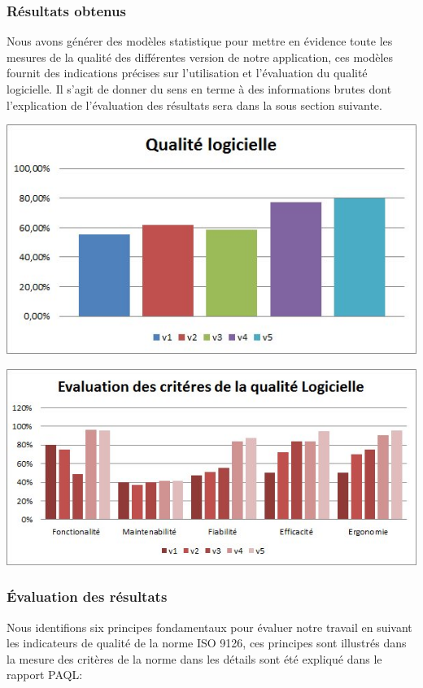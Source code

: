 \documentclass{scrartcl}
\begin{document}
\subsubsection{Résultats obtenus}

Nous avons générer des modèles statistique pour mettre en évidence toute les mesures de la qualité des différentes version de notre application, ces modèles fournit des indications précises sur l'utilisation et l'évaluation du qualité logicielle. Il s'agit de donner du sens en terme à des informations brutes dont l'explication de l'évaluation des résultats sera dans la sous section suivante.

 \begin{center}
 	\includegraphics[width=0.60\columnwidth]{evalqualit}
 	\label{fig-label}
 \end{center}

  \begin{center}
  	\includegraphics[width=0.60\columnwidth]{cirqualit}
  	\label{fig-label}
  \end{center}
\subsubsection{Évaluation des résultats}
Nous identifions six principes fondamentaux pour évaluer notre travail en suivant les indicateurs de qualité de la norme ISO 9126, ces principes sont illustrés dans la mesure des critères de la norme dans les détails sont été expliqué dans le rapport PAQL:
\end{document}
